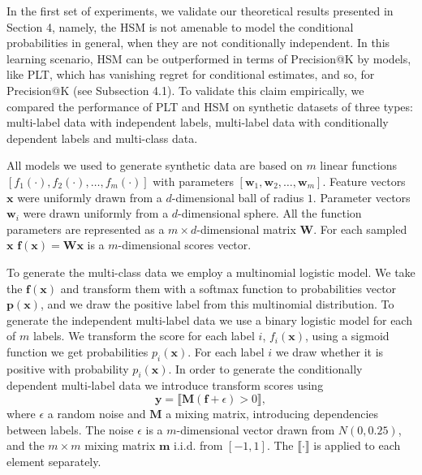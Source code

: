 \documentclass{article}
\newcommand{\Algo}[1]{\textsc{#1}}
\renewcommand{\vec}[1]{\boldsymbol{#1}}
\newcommand{\bx}{\vec{x}}
\newcommand{\by}{\vec{y}}
\newcommand{\bw}{\vec{w}}
\newcommand{\assert}[1]{\llbracket #1 \rrbracket}
\begin{document}
In the first set of experiments, we validate our theoretical results presented in Section 4, namely, the \Algo{HSM} is not amenable to model the conditional probabilities in general, when they are not conditionally independent. In this learning scenario, \Algo{HSM} can be outperformed in terms of Precision@K by models, like \Algo{PLT}, which has vanishing regret for conditional estimates, and so, for Precision@K (see Subsection 4.1). To validate this claim empirically, we compared the performance of \Algo{PLT} and \Algo{HSM} on synthetic datasets of three types: multi-label data with independent labels, multi-label data with conditionally dependent labels and multi-class data. 


All models we used to generate synthetic data are based on $m$ linear functions $[f_1(\cdot), f_2(\cdot), \ldots, f_m(\cdot)]$ with parameters $[\boldsymbol{w}_1, \boldsymbol{w}_2, \ldots, \boldsymbol{w}_m]$. Feature vectors $\bx$ were uniformly drawn from a $d$-dimensional ball of radius $1$. Parameter vectors $\boldsymbol{w}_i$ were drawn uniformly from a $d$-dimensional sphere. All the function parameters are represented as a $m \times d$-dimensional matrix $\boldsymbol{W}$. For each sampled $\bx$ $\boldsymbol{f}(\bx) = \boldsymbol{W}\bx$  is a $m$-dimensional scores vector.

To generate the multi-class data we employ a multinomial logistic model. We take the $\boldsymbol{f}(\bx)$ and transform them with a softmax function to probabilities vector $\boldsymbol{p}(\bx)$, and we draw the positive label from this multinomial distribution.
To generate the independent multi-label data we use a binary logistic model for each of $m$ labels. We transform the score for each label $i$, $f_i(\bx)$, using a sigmoid function we get probabilities $p_i(\bx)$. For each label $i$ we draw whether it is positive with probability $p_i(\bx)$. In order to generate the conditionally dependent multi-label data we introduce transform scores using 
\begin{equation*}
\by = \assert{\boldsymbol{M} (\boldsymbol{f} +  \epsilon ) >  0  },
\end{equation*}
where $\epsilon$ a random noise and $\boldsymbol{M}$ a mixing matrix, introducing dependencies between labels. The noise $\epsilon$ is a $m$-dimensional vector drawn from $N(0, 0.25)$, and the $m \times m$ mixing matrix $\boldsymbol{m}$ i.i.d. from $[-1, 1]$. The $\assert{\cdot}$ is applied to each element separately.
\end{document}
